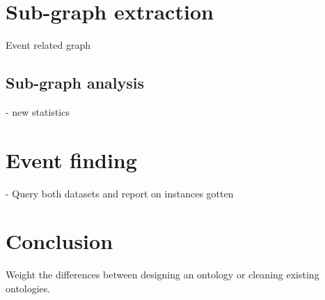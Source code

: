 \documentclass[runningheads,a4paper]{../../StyleFiles/llncs}
\begin{document}
\section{Sub-graph extraction}
Event related graph

\subsection{Sub-graph analysis}
- new statistics

\section{Event finding}
- Query both datasets and report on instances gotten

\section{Conclusion}
Weight the differences between designing an ontology or cleaning existing ontologies.



\end{document}
